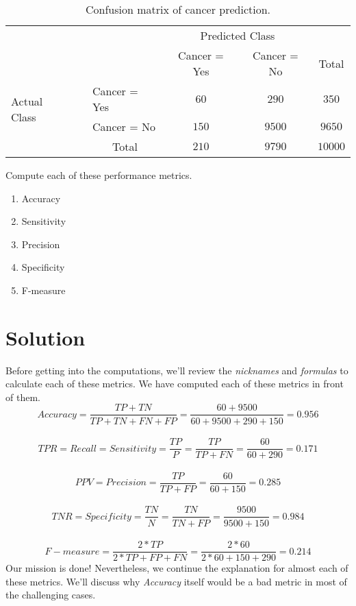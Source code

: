 \documentclass[12pt]{article}
\numberwithin{equation}{section}
\numberwithin{table}{section}
\numberwithin{figure}{section}
\begin{document}
\def\arraystretch{1.5}
\begin{table}[!h]
	\centering
	\begin{tabular}{l|l|c|c|c}
		\multicolumn{2}{c}{}&\multicolumn{2}{c}{Predicted Class}&\\
		\cline{3-4}
		\multicolumn{2}{c|}{}&Cancer = Yes&Cancer = No&\multicolumn{1}{c}{Total}\\
		\cline{2-4}
		\multirow{2}{*}{Actual Class\ \ }& Cancer = Yes & $60$ & $290$ & $350$\\
		\cline{2-4}
		& Cancer = No & $150$ & $9500$ & $9650$\\
		\cline{2-4}
		\multicolumn{1}{c}{} & \multicolumn{1}{c}{Total} & \multicolumn{1}{c}{$210$} & \multicolumn{    1}{c}{$9790$} & \multicolumn{1}{c}{$10000$}\\
	\end{tabular}
	\caption{Confusion matrix of cancer prediction.}
\end{table} 
Compute each of these performance metrics.
\begin{enumerate}[label=(\alph*)]
	\item Accuracy
	\item Sensitivity
	\item Precision
	\item Specificity
	\item F-measure
\end{enumerate}

\section*{Solution}
Before getting into the computations, we'll review the \textit{nicknames} and \textit{formulas} to calculate each of these metrics. We have computed each of these metrics in front of them.\\
\begin{equation}
	Accuracy = \frac{TP + TN}{TP + TN + FN + FP} = \frac{60 + 9500}{60 + 9500 + 290 + 150} = 0.956
\end{equation}
\\
\begin{equation}
	TPR = Recall = Sensitivity = \frac{TP}{P} = \frac{TP}{TP + FN} = \frac{60}{60 + 290} = 0.171
\end{equation}
\\
\begin{equation}
	PPV = Precision = \frac{TP}{TP + FP} = \frac{60}{60+150} = 0.285
\end{equation}
\\
\begin{equation}
	TNR = Specificity = \frac{TN}{N} = \frac{TN}{TN + FP} = \frac{9500}{9500+150} = 0.984
\end{equation}
\\
\begin{equation}
	F-measure = \frac{2*TP}{2*TP + FP + FN} = \frac{2*60}{2*60 + 150 + 290} = 0.214
\end{equation}
Our mission is done! Nevertheless, we continue the explanation for almost each of these metrics. We'll discuss why \textit{Accuracy} itself would be a bad metric in most of the challenging cases.
\end{document}
